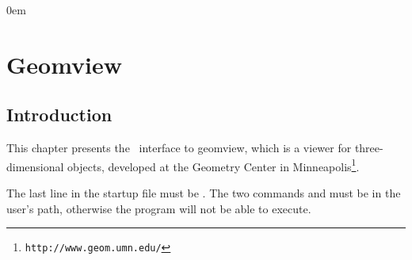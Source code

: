 \newcommand{\Section}[1]{Section~{\protect\ref{#1}}}
\newcommand{\Chapter}[1]{Chapter~{\protect\ref{#1}}}
\newcommand{\new}[1]{\marginpar{\sf #1}}

\newcommand{\what}{\mbox{?\hspace*{2cm}?}}


\parindent0em
\setlength{\parskip}{1ex minus 0.9ex}
\sloppy

\newcommand{\note}[1]{{\bf NOTE: #1}}

\chapter{Geomview} \label{ChapterGeomview}


\section{Introduction}

This chapter presents the \cgal\ interface to geomview, which is a
viewer for three-dimensional objects, developed at the Geometry Center
in Minneapolis\footnote{\tt http://www.geom.umn.edu/}.

 The last line in the startup file 
must be . The two commands  and 
must be in the user's path, otherwise the program will not be able to execute.

